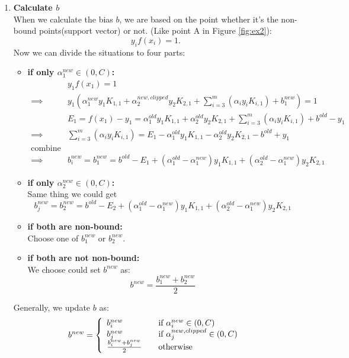 \documentclass[a4paper]{article}
\begin{document}
\begin{enumerate}
\item{\textbf{Calculate $b$} \\
When we calculate the bias $b$, we are based on the point whether it's the non-bound points(support vector) or not. (Like point A in Figure \ref{fig:ex2}):
$$
	y_i  f(x_i) = 1.
$$
Now we can divide the situations to four parts:
\begin{itemize}
\item{ \textbf{if only $\alpha_1^{new} \in (0, C)$:} \\
\begin{align*}
& y_1 f(x_1) = 1 \\
\implies & y_1 (\alpha_1^{new} y_1 K_{1,1} + \alpha_2^{new, clipped} y_2 K_{2,1} + \sum_{i=3}^{m}(\alpha_iy_iK_{i,1}) + b_1^{new}) = 1 \\
& E_1 = f(x_1) - y_1 = \alpha_1^{old}y_1 K_{1,1} + \alpha_2^{old} y_2 K_{2,1} + \sum_{i=3}^{m}(\alpha_i y_i K_{i,1}) + b^{old} - y_1 \\
\implies & \sum_{i=3}^{m}(\alpha_i y_i K_{i,1}) = E_1 -  \alpha_1^{old}y_1 K_{1,1} - \alpha_2^{old} y_2 K_{2,1} - b^{old} + y_1 \\
\text{combine them} & \\
\implies &b_i^{new} = b_1^{new} = b^{old} - E_1 + (\alpha_1^{old} - \alpha_1^{new})y_1K_{1,1} + (\alpha_2^{old} - \alpha_1^{new})y_2 K_{2,1} 
\end{align*}
}
\item{ \textbf{if only $\alpha_2^{new} \in (0,C)$:} \\
Same thing we could get
$$
b_j^{new} = b_2^{new} = b^{old} - E_2 + (\alpha_1^{old} - \alpha_1^{new})y_1K_{1,1} + (\alpha_2^{old} - \alpha_1^{new})y_2 K_{2,1} 
$$
}

\item{ \textbf{if both are non-bound:} \\
Choose one of $b_1^{new}$ or $b_2^{new}$.
}

\item{ \textbf{if both are not non-bound:} \\
We choose could set $b^{new}$ as:
$$
b^{new} = \frac{b_1^{new} + b_2^{new}} {2}
$$
}
\end{itemize}
Generally, we update $b$ as:
\[ b^{new} = \left\{ 
  \begin{array}{l l}
    b_i^{new} & \quad \text{if $\alpha_i^{new} \in (0, C)$ }\\
    b_j^{new} & \quad \text{if $\alpha_j^{new, clipped} \in (0, C) $} \\
    \frac{b_i^{new}+b_j^{new}}{2} & \quad \text{otherwise}
  \end{array} \right.\]
}
\end{enumerate}
\end{document}
